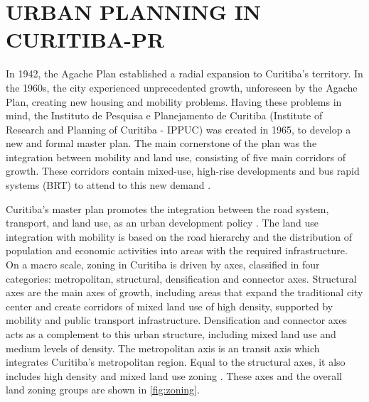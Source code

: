 \section{URBAN PLANNING IN CURITIBA-PR} \label{sec:cwb_be}

In 1942, the Agache Plan established a radial expansion to Curitiba's territory. In the 1960s, the city experienced unprecedented growth, unforeseen by the Agache Plan, creating new housing and mobility problems. Having these problems in mind, the Instituto de Pesquisa e Planejamento de Curitiba (Institute of Research and Planning of Curitiba - IPPUC) was created in 1965, to develop a new and formal master plan. The main cornerstone of the plan was the integration between mobility and land use, consisting of five main corridors of growth. These corridors contain mixed-use, high-rise developments and bus rapid systems (BRT) to attend to this new demand \cite{Rosario2016}. 

Curitiba's master plan promotes the integration between the road system, transport, and land use, as an urban development policy \cite{Curitiba2015}. The land use integration with mobility is based on the road hierarchy and the distribution of population and economic activities into areas with the required infrastructure. On a macro scale, zoning in Curitiba is driven by axes, classified in four categories: metropolitan, structural, densification and connector axes. Structural axes are the main axes of growth, including areas that expand the traditional city center and create corridors of mixed land use of high density, supported by mobility and public transport infrastructure. Densification and connector axes acts as a complement to this urban structure, including mixed land use and medium levels of density. The metropolitan axis is an transit axis which integrates Curitiba's metropolitan region. Equal to the structural axes, it also includes high density and mixed land use zoning \cite{Curitiba2019a}. These axes and the overall land zoning groups are shown in \autoref{fig:zoning}.

